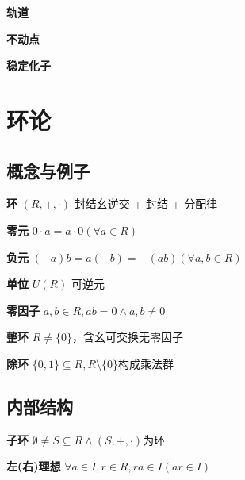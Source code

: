 \documentclass[a4paper,10pt]{ctexart}
\begin{document}
\begin{multicols}{3}
    \textbf{轨道}

    \textbf{不动点}

    \textbf{稳定化子}

    \begin{theorem}[Burnside 引理]

    \end{theorem}

    \section{环论}

    \subsection{概念与例子}

    \textbf{环} $(R, +, \cdot)$ 封结幺逆交 + 封结 + 分配律

    \textbf{零元} $0 \cdot a = a \cdot 0 (\forall a \in R)$

    \textbf{负元} $(-a)b = a(-b) = -(ab) (\forall a, b \in R)$

    \textbf{单位} $U(R)$ 可逆元

    \textbf{零因子} $a, b \in R, ab = 0 \wedge a, b \ne 0$

    \textbf{整环} $R\ne \{0\}$，含幺可交换无零因子

    \textbf{除环} $\{0, 1\} \subseteq R, R \setminus \{0\}$构成乘法群

    \subsection{内部结构}

    \textbf{子环} $\emptyset \!\neq\! S \!\subseteq\! R \wedge (S, +, \cdot)$为环

    \begin{theorem}[子环判则]

    \end{theorem}

    \begin{theorem}[子环运算律]

    \end{theorem}

    \textbf{左(右)理想} $\forall a \in I, r \in R, ra \in I (ar \in I)$

    \begin{theorem}[理想判则]

    \end{theorem}


\end{multicols}
\end{document}
